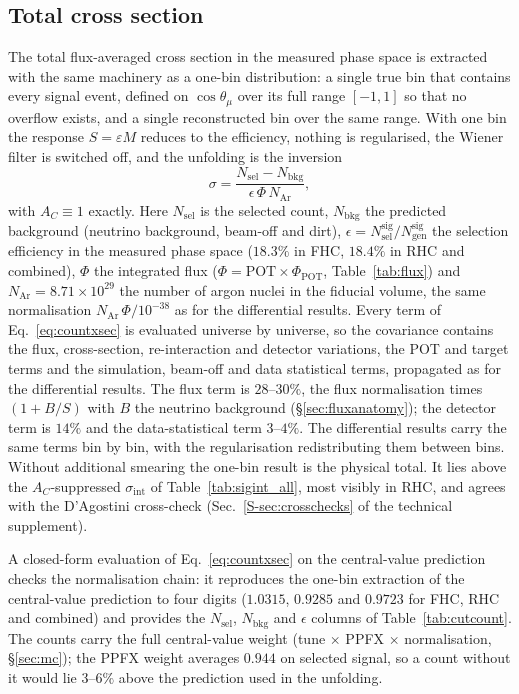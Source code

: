 \documentclass[11pt,a4paper]{article}
\newcommand{\suppref}[2]{#1~\ref{S-#2} of the technical supplement}
\begin{document}
\subsection{Total cross section}
\label{sec:total_xsec}

The total flux-averaged cross section in the measured phase space is extracted with the same
machinery as a one-bin distribution: a single true bin that contains every signal event, defined on
$\cos\theta_\mu$ over its full range $[-1,1]$ so that no overflow exists, and a single reconstructed
bin over the same range. With one bin the response $S=\varepsilon M$ reduces to the efficiency,
nothing is regularised, the Wiener filter is switched off, and the unfolding is the inversion
\begin{equation}
  \sigma = \frac{N_\mathrm{sel} - N_\mathrm{bkg}}{\epsilon \, \Phi \, N_\mathrm{Ar}},
  \label{eq:countxsec}
\end{equation}
with $A_C\equiv1$ exactly. Here $N_\mathrm{sel}$ is the selected count, $N_\mathrm{bkg}$ the predicted
background (neutrino background, beam-off and dirt), $\epsilon =
N^{\mathrm{sig}}_\mathrm{sel}/N^{\mathrm{sig}}_\mathrm{gen}$ the selection efficiency in the measured
phase space ($18.3\%$ in FHC, $18.4\%$ in RHC and combined), $\Phi$ the integrated flux ($\Phi = \text{POT}\times
\Phi_\mathrm{POT}$, Table~\ref{tab:flux}) and $N_\mathrm{Ar} = 8.71\times10^{29}$ the number of argon
nuclei in the fiducial volume, the same normalisation $N_\mathrm{Ar}\,\Phi/10^{-38}$ as for the
differential results. Every term of Eq.~\eqref{eq:countxsec} is evaluated universe by universe, so the
covariance contains the flux, cross-section, re-interaction and detector variations, the POT and
target terms and the simulation, beam-off and data statistical terms, propagated as for the
differential results. The flux term is $28$--$30\%$, the flux normalisation times $(1+B/S)$ with $B$
the neutrino background (\S\ref{sec:fluxanatomy}); the detector term is $14\%$ and the
data-statistical term $3$--$4\%$. The differential results carry the same terms bin by bin, with the
regularisation redistributing them between bins. Without additional smearing the one-bin result is
the physical total. It lies above the $A_C$-suppressed $\sigma_\mathrm{int}$ of
Table~\ref{tab:sigint_all}, most visibly in RHC, and agrees with the D'Agostini cross-check
(\suppref{Sec.}{sec:crosschecks}).

A closed-form evaluation of Eq.~\eqref{eq:countxsec} on the central-value prediction checks the
normalisation chain: it reproduces the one-bin extraction of the central-value prediction to four
digits ($1.0315$, $0.9285$ and $0.9723$ for FHC, RHC and combined) and
provides the $N_\mathrm{sel}$, $N_\mathrm{bkg}$ and $\epsilon$ columns of Table~\ref{tab:cutcount}.
The counts carry the full central-value weight (tune $\times$ PPFX $\times$ normalisation,
\S\ref{sec:mc}); the PPFX weight averages $0.944$ on selected signal, so a count without it would
lie $3$--$6\%$ above the prediction used in the unfolding.
\end{document}
